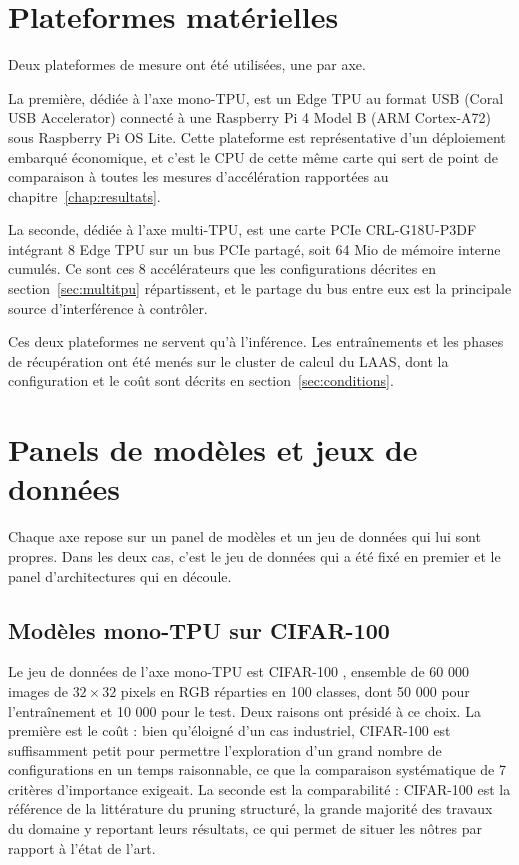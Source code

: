 \documentclass[11pt,a4paper]{report}
\begin{document}
\section{Plateformes matérielles}
\label{sec:plateformes}

Deux plateformes de mesure ont été utilisées, une par axe.

La première, dédiée à l'axe mono-TPU, est un Edge TPU au format USB (Coral USB Accelerator) connecté à une Raspberry Pi 4 Model B (ARM Cortex-A72) sous Raspberry Pi OS Lite. Cette plateforme est représentative d'un déploiement embarqué économique, et c'est le CPU de cette même carte qui sert de point de comparaison à toutes les mesures d'accélération rapportées au chapitre~\ref{chap:resultats}.

La seconde, dédiée à l'axe multi-TPU, est une carte PCIe CRL-G18U-P3DF \cite{AIAcceleratorPCIea} intégrant 8 Edge TPU sur un bus PCIe partagé, soit 64 Mio de mémoire interne cumulés. Ce sont ces 8 accélérateurs que les configurations décrites en section~\ref{sec:multitpu} répartissent, et le partage du bus entre eux est la principale source d'interférence à contrôler.

Ces deux plateformes ne servent qu'à l'inférence. Les entraînements et les phases de récupération ont été menés sur le cluster de calcul du LAAS, dont la configuration et le coût sont décrits en section~\ref{sec:conditions}.

\section{Panels de modèles et jeux de données}
\label{sec:modeles}

Chaque axe repose sur un panel de modèles et un jeu de données qui lui sont propres. Dans les deux cas, c'est le jeu de données qui a été fixé en premier et le panel d'architectures qui en découle.

\subsection{Modèles mono-TPU sur CIFAR-100}

Le jeu de données de l'axe mono-TPU est CIFAR-100 \cite{krizhevskyLearningMultipleLayers2009}, ensemble de 60 000 images de $32 \times 32$ pixels en RGB réparties en 100 classes, dont 50 000 pour l'entraînement et 10 000 pour le test. Deux raisons ont présidé à ce choix. La première est le coût : bien qu'éloigné d'un cas industriel, CIFAR-100 est suffisamment petit pour permettre l'exploration d'un grand nombre de configurations en un temps raisonnable, ce que la comparaison systématique de 7 critères d'importance exigeait. La seconde est la comparabilité : CIFAR-100 est la référence de la littérature du pruning structuré, la grande majorité des travaux du domaine y reportant leurs résultats, ce qui permet de situer les nôtres par rapport à l'état de l'art.
\end{document}
